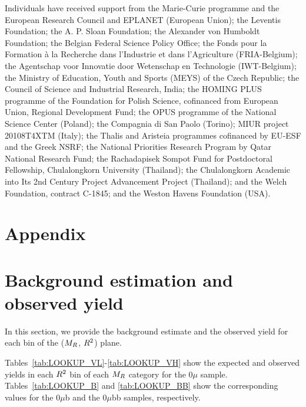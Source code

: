 \begin{acknowledgments}
Individuals have received support from the Marie-Curie programme and the European Research Council and EPLANET (European Union); the Leventis Foundation; the A. P. Sloan Foundation; the Alexander von Humboldt Foundation; the Belgian Federal Science Policy Office; the Fonds pour la Formation \`a la Recherche dans l'Industrie et dans l'Agriculture (FRIA-Belgium); the Agentschap voor Innovatie door Wetenschap en Technologie (IWT-Belgium); the Ministry of Education, Youth and Sports (MEYS) of the Czech Republic; the Council of Science and Industrial Research, India; the HOMING PLUS programme of the Foundation for Polish Science, cofinanced from European Union, Regional Development Fund; the OPUS programme of the National Science Center (Poland); the Compagnia di San Paolo (Torino); MIUR project 20108T4XTM (Italy); the Thalis and Aristeia programmes cofinanced by EU-ESF and the Greek NSRF; the National Priorities Research Program by Qatar National Research Fund; the Rachadapisek Sompot Fund for Postdoctoral Fellowship, Chulalongkorn University (Thailand); the Chulalongkorn Academic into Its 2nd Century Project Advancement Project (Thailand); and the Welch Foundation, contract C-1845; and  the Weston Havens Foundation (USA).
\end{acknowledgments}


\appendix

\section*{Appendix}\label{sec:appendix}


\section{Background estimation and observed yield}

In this section, we provide the background estimate and the
observed yield for each bin of the ($M_R$, $R^2$)
plane.

Tables~\ref{tab:LOOKUP_VL}-\ref{tab:LOOKUP_VH} show the expected and
observed yields in each $R^2$ bin of each $M_R$
category for the 0$\mu$ sample.  Tables~\ref{tab:LOOKUP_B} and
\ref{tab:LOOKUP_BB} show the corresponding values for the 0$\mu$b and
the 0$\mu$bb samples, respectively.

